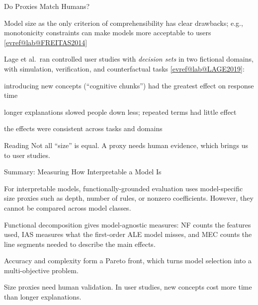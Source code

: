 \documentclass[10pt,compress,t,notes=noshow, xcolor=table]{beamer}
\makeatletter
\newcommand{\citeref}[1]{%
  \href{\csname evref@url@#1\endcsname}{[\csname evref@lab@#1\endcsname]}}
\makeatother
\begin{document}
\begin{framev}[align=mid]{Do Proxies Match Humans?}
\begin{itemizeM}
\item Model size as the only criterion of comprehensibility has clear drawbacks; e.g., monotonicity constraints can make models more acceptable to users \citeref{FREITAS2014}
\item Lage et al.\ ran controlled user studies with \emph{decision sets} in two fictional domains, with simulation, verification, and counterfactual tasks \citeref{LAGE2019}:
  \begin{itemizeS}
  \item introducing new concepts (``cognitive chunks'') had the greatest effect on response time
  \item longer explanations slowed people down less; repeated terms had little effect
  \item the effects were consistent across tasks and domains
  \end{itemizeS}
\end{itemizeM}
\pause
\spacer[0.4]
\begin{block}{Reading}
Not all ``size'' is equal. A proxy needs human evidence, which brings us to user studies.
\end{block}
\end{framev}


\begin{framev}[align=mid]{Summary: Measuring How Interpretable a Model Is}
\begin{itemizeM}
\item For interpretable models, functionally-grounded evaluation uses model-specific size proxies such as depth, number of rules, or nonzero coefficients. However, they cannot be compared across model classes.
\item Functional decomposition gives model-agnostic measures: NF counts the features used, IAS measures what the first-order ALE model misses, and MEC counts the line segments needed to describe the main effects.
\item Accuracy and complexity form a Pareto front, which turns model selection into a multi-objective problem.
\item Size proxies need human validation. In user studies, new concepts cost more time than longer explanations.
\end{itemizeM}
\end{framev}


\endlecture
\end{document}
